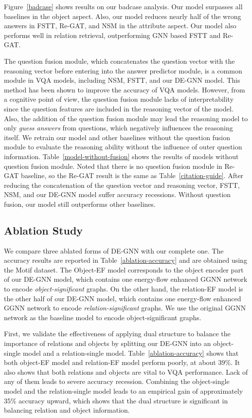 \documentclass[letterpaper]{article} %
\begin{document}
Figure~\ref{badcase} shows results on our badcase analysis. Our model surpasses all baselines in the object aspect. Also, our model reduces nearly half of the wrong answers in FSTT, Re-GAT, and NSM in the attribute aspect. Our model also performs well in relation retrieval, outperforming GNN based FSTT and Re-GAT.

The question fusion module, which concatenates the question vector with the reasoning vector before entering into the answer predictor module, is a common module in VQA models, including NSM, FSTT, and our DE-GNN model. This method has been shown to improve the accuracy of VQA models. However, from a cognitive point of view, the question fusion module lacks of interpretability since the question features are included in the reasoning vector of the model. 
Also, the addition of the question fusion module may lead the reasoning model to only \emph{guess answers} from questions, which negatively influences the reasoning itself. 
We retrain our model and other baselines without the question fusion module to evaluate the reasoning ability without the influence of outer question information. 
Table~\ref{model-without-fusion} shows the results of models without question fusion module. Noted that there is no question fusion module in Re-GAT baseline, so the Re-GAT result is the same as Table~\ref{citation-guide}.
After reducing the concatenation of the question vector and reasoning vector, FSTT, NSM, and our DE-GNN model suffer accuracy recessions. Without question fusion, our model still outperforms other baselines.

\subsection{Ablation Study}

We compare three ablated forms of DE-GNN with our complete one. 
The accuracy results are reported in Table~\ref{ablation-accuracy} and are obtained using the Motif dataset. 
The Object-EF model corresponds to the object encoder part of our DE-GNN model, which contains one energy-flow enhanced GGNN network to encode \emph{object-significant} graphs. 
On the other hand, the relation-EF model is the other half of our DE-GNN model, which contains one energy-flow enhanced GGNN network to encode \emph{relation-significant} graphs. 
We use the original GGNN network as the baseline model to encode object-significant graphs.

First, we validate the effectiveness of applying dual structure to balance the importance of relations and objects by splitting our DE-GNN into an object-single model and a relation-single model. Table~\ref{ablation-accuracy} shows that both object-EF model and relation-EF model perform poorly, at about 39\%. 
It also shows that both relations and objects are vital to VQA performance. Lack of any of them leads to severe accuracy recession. Combining the object-single model and the relation-single model leads to an empirical gain of approximately 35\% accuracy upward, which shows that the dual structure is significant in balancing relation and object information. 
\end{document}
